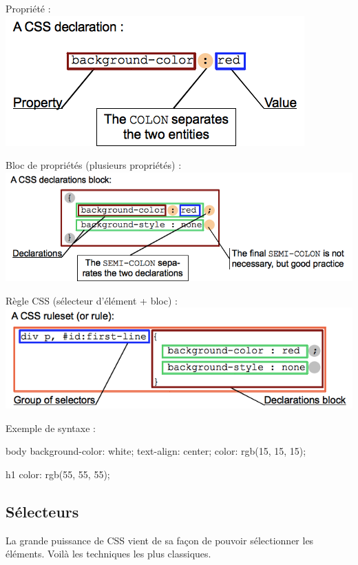 \documentclass[10pt, landscape, french]{article}
\newenvironment{codeCSS}[1]{%
#1 :  %
\minted{CSS}%
}{%
\endminted%
}
\begin{document}
\begin{multicols*}{3}
\begin{center}
 Propriété : 
 \includegraphics[width=0.8\linewidth]{css_syntax-declaration.png}
\end{center}    

\begin{center}
 Bloc de propriétés (plusieurs propriétés) :
 \includegraphics[width=0.8\linewidth]{css_syntax-declarations-block.png}
\end{center}    

\begin{center}
 Règle CSS (sélecteur d'élément + bloc) : 
 \includegraphics[width=0.8\linewidth]{css_syntax-ruleset.png}
\end{center}    

\begin{codeCSS}{Exemple de syntaxe}
body {
    background-color: white;
    text-align: center;
    color: rgb(15, 15, 15);
}

h1 {
    color: rgb(55, 55, 55);
}
\end{codeCSS}

\subsection{Sélecteurs}

La grande puissance de CSS vient de sa façon de pouvoir sélectionner les éléments. 
Voilà les techniques les plus classiques.
\vspace{0.2cm}


\end{multicols*}
\end{document}

